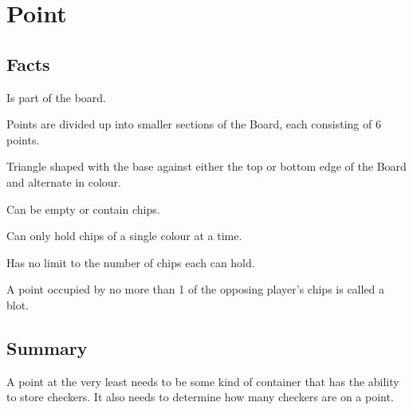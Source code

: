 \section{Point}

\subsection{Facts}

\begin{dashed}
    \item Is part of the board.
    \item Points are divided up into smaller sections of the Board, each consisting of 6 points.
    \item Triangle shaped with the base against either the top or bottom edge of the Board and alternate in colour.
    \item Can be empty or contain chips.
    \item Can only hold chips of a single colour at a time.
    \item Has no limit to the number of chips each can hold.
    \item A point occupied by no more than 1 of the opposing player’s chips is called a blot.
\end{dashed}


\subsection{Summary}

A point at the very least needs to be some kind of container that has the ability
to store checkers. It also needs to determine how many checkers are on a point.

